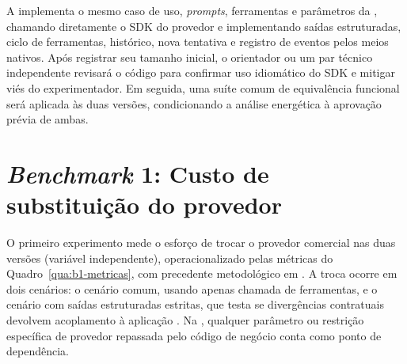 A \versaoD{} implementa o mesmo caso de uso, \textit{prompts}, ferramentas e
parâmetros da \versaoH{}, chamando diretamente o SDK do provedor e implementando
saídas estruturadas, ciclo de ferramentas, histórico, nova tentativa e registro
de eventos pelos meios nativos. Após registrar seu tamanho inicial, o
orientador ou um par técnico independente revisará o código para confirmar uso
idiomático do SDK e mitigar viés do experimentador. Em seguida, uma suíte comum
de equivalência funcional será aplicada às duas versões, condicionando a análise
energética à aprovação prévia de ambas.

\section{\textit{Benchmark} 1: Custo de substituição do provedor}
\label{sec:b1}

O primeiro experimento mede o esforço de trocar o provedor comercial nas duas
versões (variável independente), operacionalizado pelas métricas do
Quadro~\ref{qua:b1-metricas}, com precedente metodológico em
. A troca ocorre em dois cenários: o cenário comum, usando
apenas chamada de ferramentas, e o cenário com saídas estruturadas estritas,
que testa se divergências contratuais devolvem acoplamento à aplicação
\cite{thoughtworkslitellm}. Na \versaoH{}, qualquer parâmetro ou restrição
específica de provedor repassada pelo código de negócio conta como ponto de
dependência.

